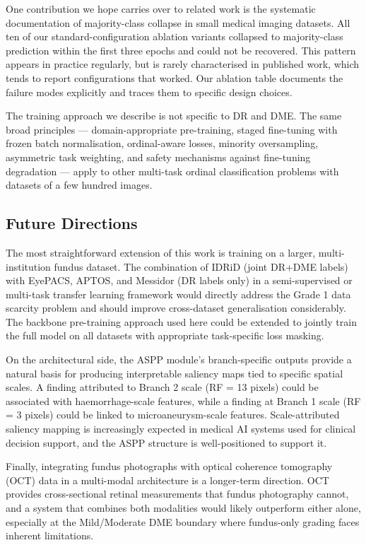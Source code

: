 \documentclass[12pt,a4paper]{article}
\begin{document}
One contribution we hope carries over to related work is the systematic documentation of majority-class collapse in small medical imaging datasets. All ten of our standard-configuration ablation variants collapsed to majority-class prediction within the first three epochs and could not be recovered. This pattern appears in practice regularly, but is rarely characterised in published work, which tends to report configurations that worked. Our ablation table documents the failure modes explicitly and traces them to specific design choices.

The training approach we describe is not specific to DR and DME. The same broad principles --- domain-appropriate pre-training, staged fine-tuning with frozen batch normalisation, ordinal-aware losses, minority oversampling, asymmetric task weighting, and safety mechanisms against fine-tuning degradation --- apply to other multi-task ordinal classification problems with datasets of a few hundred images.

\subsection{Future Directions}

The most straightforward extension of this work is training on a larger, multi-institution fundus dataset. The combination of IDRiD (joint DR+DME labels) with EyePACS, APTOS, and Messidor (DR labels only) in a semi-supervised or multi-task transfer learning framework would directly address the Grade 1 data scarcity problem and should improve cross-dataset generalisation considerably. The backbone pre-training approach used here could be extended to jointly train the full model on all datasets with appropriate task-specific loss masking.

On the architectural side, the ASPP module's branch-specific outputs provide a natural basis for producing interpretable saliency maps tied to specific spatial scales. A finding attributed to Branch 2 scale (RF = 13 pixels) could be associated with haemorrhage-scale features, while a finding at Branch 1 scale (RF = 3 pixels) could be linked to microaneurysm-scale features. Scale-attributed saliency mapping is increasingly expected in medical AI systems used for clinical decision support, and the ASPP structure is well-positioned to support it.

Finally, integrating fundus photographs with optical coherence tomography (OCT) data in a multi-modal architecture is a longer-term direction. OCT provides cross-sectional retinal measurements that fundus photography cannot, and a system that combines both modalities would likely outperform either alone, especially at the Mild/Moderate DME boundary where fundus-only grading faces inherent limitations.
\end{document}
